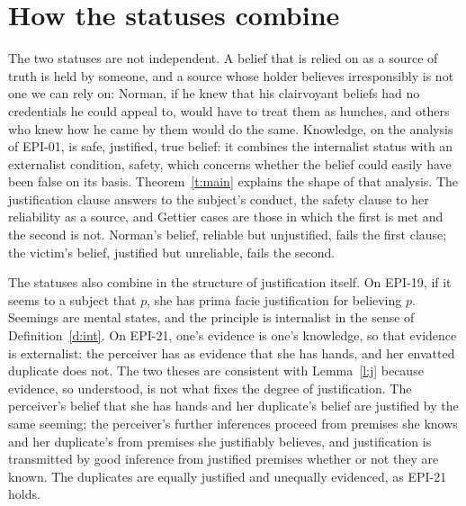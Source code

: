 \documentclass{situationist-preprint}
\begin{document}
\section{How the statuses combine}

The two statuses are not independent. A belief that is relied on as a source of truth is held by someone, and a source whose holder believes irresponsibly is not one we can rely on: Norman, if he knew that his clairvoyant beliefs had no credentials he could appeal to, would have to treat them as hunches, and others who knew how he came by them would do the same. Knowledge, on the analysis of EPI-01, is safe, justified, true belief: it combines the internalist status with an externalist condition, safety, which concerns whether the belief could easily have been false on its basis. Theorem~\ref{t:main} explains the shape of that analysis. The justification clause answers to the subject's conduct, the safety clause to her reliability as a source, and Gettier cases are those in which the first is met and the second is not. Norman's belief, reliable but unjustified, fails the first clause; the victim's belief, justified but unreliable, fails the second.

The statuses also combine in the structure of justification itself. On EPI-19, if it seems to a subject that $p$, she has prima facie justification for believing $p$. Seemings are mental states, and the principle is internalist in the sense of Definition~\ref{d:int}. On EPI-21, one's evidence is one's knowledge, so that evidence is externalist: the perceiver has as evidence that she has hands, and her envatted duplicate does not. The two theses are consistent with Lemma~\ref{l:j} because evidence, so understood, is not what fixes the degree of justification. The perceiver's belief that she has hands and her duplicate's belief are justified by the same seeming; the perceiver's further inferences proceed from premises she knows and her duplicate's from premises she justifiably believes, and justification is transmitted by good inference from justified premises whether or not they are known. The duplicates are equally justified and unequally evidenced, as EPI-21 holds.
\end{document}

